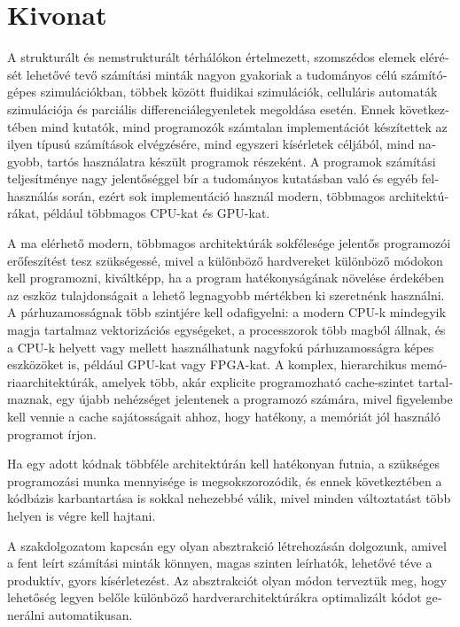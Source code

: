 \documentclass[fontsize=11pt, appendixprefix=true]{scrreprt}
\begin{document}
\section*{Kivonat}
\begin{otherlanguage}{magyar}
A strukturált és nemstrukturált térhálókon értelmezett, szomszédos elemek
elérését lehetővé tevő számítási minták nagyon gyakoriak a tudományos célú
számítógépes szimulációkban, többek között fluidikai szimulációk, celluláris
automaták szimulációja és parciális differenciálegyenletek megoldása
esetén. Ennek következtében mind kutatók, mind programozók számtalan
implementációt készítettek az ilyen típusú számítások elvégzésére, mind egyszeri
kísérletek céljából, mind nagyobb, tartós használatra készült programok
részeként. A programok számítási teljesítménye nagy jelentőséggel bír a
tudományos kutatásban való és egyéb felhasználás során, ezért sok implementáció
használ modern, többmagos architektúrákat, például többmagos CPU-kat és GPU-kat.

A ma elérhető modern, többmagos architektúrák sokfélesége jelentős programozói
erőfeszítést tesz szükségessé, mivel a különböző hardvereket különböző módokon
kell programozni, kiváltképp, ha a program hatékonyságának növelése érdekében az
eszköz tulajdonságait a lehető legnagyobb mértékben ki szeretnénk használni. A
párhuzamosságnak több szintjére kell odafigyelni: a modern CPU-k mindegyik magja
tartalmaz vektorizációs egységeket, a processzorok több magból állnak, és a
CPU-k helyett vagy mellett használhatunk nagyfokú párhuzamosságra képes
eszközöket is, például GPU-kat vagy FPGA-kat. A komplex, hierarchikus
memóriaarchitektúrák, amelyek több, akár explicite programozható cache-szintet
tartalmaznak, egy újabb nehézséget jelentenek a programozó számára, mivel
figyelembe kell vennie a cache sajátosságait ahhoz, hogy hatékony, a memóriát
jól használó programot írjon.

Ha egy adott kódnak többféle architektúrán kell hatékonyan futnia, a szükséges
programozási munka mennyisége is megsokszorozódik, és ennek következtében a
kódbázis karbantartása is sokkal nehezebbé válik, mivel minden változtatást több
helyen is végre kell hajtani.

A szakdolgozatom kapcsán egy olyan absztrakció létrehozásán dolgozunk, amivel a
fent leírt számítási minták könnyen, magas szinten leírhatók, lehetővé téve a
produktív, gyors kísérletezést. Az absztrakciót olyan módon terveztük meg, hogy
lehetőség legyen belőle különböző hardverarchitektúrákra optimalizált kódot
generálni automatikusan.


\end{otherlanguage}
\end{document}
